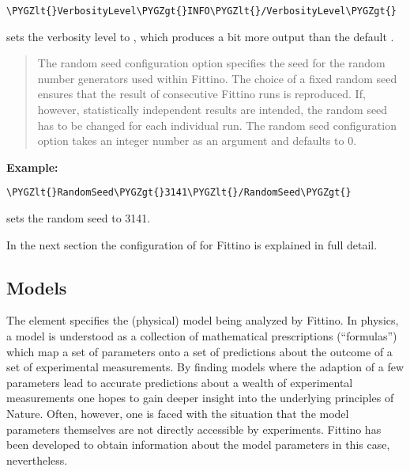 \documentclass[letterpaper,10pt,english]{sphinxmanual}
\def\PYGZlt{\char`\<}
\def\PYGZgt{\char`\>}
\begin{document}
\begin{Verbatim}[commandchars=\\\{\}]
\PYGZlt{}VerbosityLevel\PYGZgt{}INFO\PYGZlt{}/VerbosityLevel\PYGZgt{}
\end{Verbatim}

sets the verbosity level to , which produces a bit more output than the default .

\begin{quote}

The random seed configuration option specifies the seed for the random number generators used
within Fittino. The choice of a fixed random seed ensures that the result of consecutive Fittino
runs is reproduced. If, however, statistically independent results are intended, the random seed
has to be changed for each individual run. The random seed configuration option takes an integer
number as an argument and defaults to 0.
\end{quote}

\textbf{Example:}

\begin{Verbatim}[commandchars=\\\{\}]
\PYGZlt{}RandomSeed\PYGZgt{}3141\PYGZlt{}/RandomSeed\PYGZgt{}
\end{Verbatim}

sets the random seed to 3141.

In the next section the configuration of {\hyperref[models:models]{\emph{}}} for Fittino is explained in full detail.


\subsection{Models}
\label{models:models}\label{models::doc}\label{models:id1}
The  element specifies the (physical) model being analyzed by Fittino. In physics, a
model is understood as a collection of mathematical prescriptions (``formulas'') which map a set of
parameters onto a set of predictions about the outcome of a set of experimental measurements. By
finding models where the adaption of a few parameters lead to accurate predictions about a wealth of
experimental measurements one hopes to gain deeper insight into the underlying principles of Nature.
Often, however, one is faced with the situation that the model parameters themselves are not directly
accessible by experiments. Fittino has been developed to obtain information about the model
parameters in this case, nevertheless.
\end{document}

